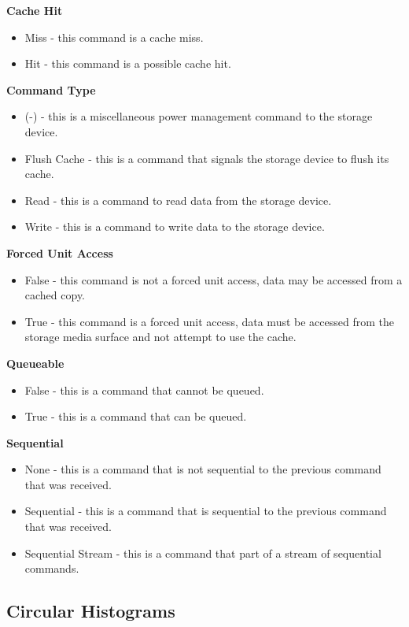 \documentclass[journal]{vgtc}                %
\begin{document}
\noindent \textbf{Cache Hit}
\begin{itemize}
\item Miss - this command is a cache miss.
\item Hit - this command is a possible cache hit.
\end{itemize}

\noindent \textbf{Command Type}
\begin{itemize}
\item (-) - this is a miscellaneous power management command to the storage device.
\item Flush Cache - this is a command that signals the storage device to flush its cache.
\item Read - this is a command to read data from the storage device.
\item Write - this is a command to write data to the storage device.
\end{itemize}

\noindent \textbf{Forced Unit Access}
\begin{itemize}
\item False - this command is not a forced unit access, data may be accessed from a cached copy.
\item True - this command is a forced unit access, data must be accessed from the storage media surface and not attempt to use the cache.
\end{itemize}

\noindent \textbf{Queueable}
\begin{itemize}
\item False - this is a command that cannot be queued.
\item True - this is a command that can be queued.
\end{itemize}

\noindent \textbf{Sequential}
\begin{itemize}
\item None - this is a command that is not sequential to the previous command that was received.
\item Sequential - this is a command that is sequential to the previous command that was received.
\item Sequential Stream - this is a command that part of a stream of sequential commands.
\end{itemize}

\subsection{Circular Histograms}
\end{document}
